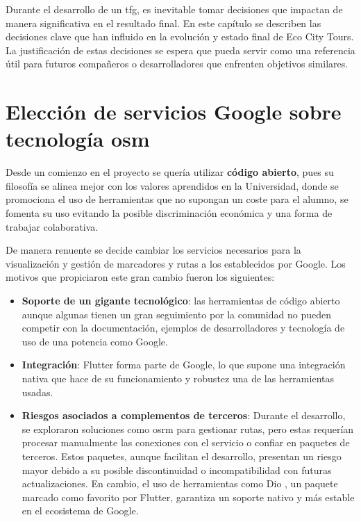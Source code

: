 
Durante el desarrollo de un \acrlong{tfg}, es inevitable tomar decisiones que impactan de manera significativa en el resultado final. En este capítulo se describen las decisiones clave que han influido en la evolución y estado final de Eco City Tours. La justificación de estas decisiones se espera que pueda servir como una referencia útil para futuros compañeros o desarrolladores que enfrenten objetivos similares. 

\section{Elección de servicios Google sobre tecnología \acrlong{osm}}

Desde un comienzo en el proyecto se quería utilizar \textbf{código abierto}, pues su filosofía se alinea mejor con los valores aprendidos en la Universidad, donde se promociona el uso de herramientas que no supongan un coste para el alumno, se fomenta su uso evitando la posible discriminación económica y una forma de trabajar colaborativa.

De manera renuente se decide cambiar los servicios necesarios para la visualización y gestión de marcadores y rutas a los establecidos por Google. Los motivos que propiciaron este gran cambio fueron los siguientes:
\begin{itemize}
	\item \textbf{Soporte de un gigante tecnológico}: las herramientas de código abierto aunque algunas tienen un gran seguimiento por la comunidad no pueden competir con la documentación, ejemplos de desarrolladores y tecnología de uso de una potencia como Google.
	\item \textbf{Integración}: Flutter forma parte de Google, lo que supone una integración nativa que hace de su funcionamiento y robustez una de las herramientas usadas.
	\item \textbf{Riesgos asociados a complementos de terceros}: Durante el desarrollo, se exploraron soluciones como \acrfull{osrm} para gestionar rutas, pero estas requerían procesar manualmente las conexiones con el servicio o confiar en paquetes de terceros. Estos paquetes, aunque facilitan el desarrollo, presentan un riesgo mayor debido a su posible discontinuidad o incompatibilidad con futuras actualizaciones. En cambio, el uso de herramientas como Dio \cite{dio_package}, un paquete marcado como favorito por Flutter, garantiza un soporte nativo y más estable en el ecosistema de Google.
\end{itemize} 


